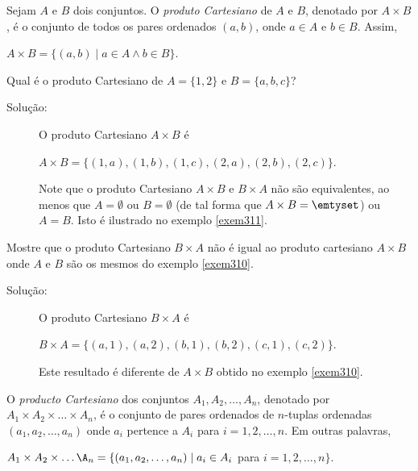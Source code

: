 \begin{defn}
\label{def38}
Sejam $A$ e $B$ dois conjuntos. O \emph{produto Cartesiano} de $A$ e $B$,
denotado por $A \times B$, é o conjunto de todos os pares ordenados $(a, b)$,
onde $a \in A$ e $b \in B$. Assim,
\begin{center}
$A \times B = \{(a,b) \mid a \in A \land b \in B\}.$
\end{center}
\end{defn}

\begin{exmp}
\label{exem310}
Qual é o produto Cartesiano de $A = \{1,2\}$ e $B = \{a,b,c\}$?
\begin{description}
\item[Solução:]O produto Cartesiano $A \times B$ é
\begin{center}
$A \times B = \{(1,a), (1,b), (1,c), (2,a), (2,b), (2,c)\}$.
\end{center}
Note que o produto Cartesiano $A \times B$ e $B \times A$ não são equivalentes,
ao menos que $A = \emptyset$ ou $B = \emptyset$ (de tal forma que $A \times B
= \emtyset$) ou $A = B$. Isto é ilustrado no exemplo \ref{exem311}.
\end{description}
\end{exmp}

\begin{exmp}
\label{exem311}
Mostre que o produto Cartesiano $B \times A$ não é igual ao produto cartesiano
$A \times B$ onde $A$ e $B$ são os mesmos do exemplo \ref{exem310}.
\begin{description}
\item[Solução:] O produto Cartesiano $B \times A$ é
\begin{center}
$B \times A = \{(a,1), (a,2), (b,1), (b,2),(c,1),(c,2)\}$.
\end{center}
Este resultado é diferente de $A \times B$ obtido no exemplo \ref{exem310}.
\end{description}
\end{exmp}

\begin{defn}
\label{def39}
O \emph{producto Cartesiano} dos conjuntos $A_1, A_2, \ldots, A_n$, denotado por
$A_1 \times A_2 \times \ldots \times A_n$, é o conjunto de pares ordenados de
$n$-tuplas ordenadas $(a_1, a_2, \ldots,a_n)$ onde $a_i$ pertence a $A_i$ para
$i = 1,2,\ldots,n$. Em outras palavras,
\begin{center}
$A_1 \times A_2 \times \ldots \A_n = \{(a_1, a_2,\ldots,a_n) \mid a_i \in
A_i$ para $i = 1,2,\ldots,n\}$.
\end{center}
\end{defn}

